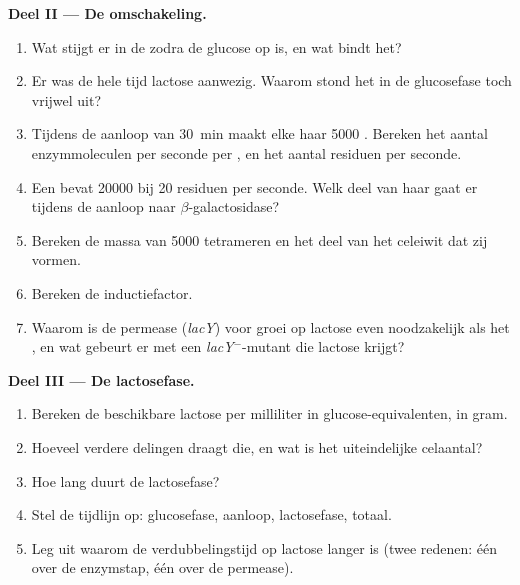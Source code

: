 \begin{problem}
\medskip
\noindent\textbf{Deel II --- De omschakeling.}
\begin{enumerate}[resume]
  \item Wat stijgt er in de  zodra de glucose op is, en wat bindt
        het?
  \item Er was de hele tijd lactose aanwezig. Waarom stond het  in de
        glucosefase toch vrijwel uit?
  \item Tijdens de aanloop van \qty{30}{min} maakt elke  haar
        \num{5000} . Bereken het aantal enzymmoleculen per seconde
        per , en het aantal residuen per seconde.
  \item Een  bevat \num{20000}  bij \qty{20}{} residuen per
        seconde. Welk deel van haar  gaat er tijdens de aanloop
        naar $\beta$-galactosidase?
  \item Bereken de massa van \num{5000} tetrameren en het deel van het
        celeiwit dat zij vormen.
  \item Bereken de inductiefactor.
  \item Waarom is de permease (\emph{lacY}) voor groei op lactose even
        noodzakelijk als het , en wat gebeurt er met een
        \emph{lacY}$^-$-mutant die lactose krijgt?
\end{enumerate}

\medskip
\noindent\textbf{Deel III --- De lactosefase.}
\begin{enumerate}[resume]
  \item Bereken de beschikbare lactose per milliliter in
        glucose-equivalenten, in gram.
  \item Hoeveel verdere delingen draagt die, en wat is het uiteindelijke
        celaantal?
  \item Hoe lang duurt de lactosefase?
  \item Stel de tijdlijn op: glucosefase, aanloop, lactosefase, totaal.
  \item Leg uit waarom de verdubbelingstijd op lactose langer is (twee
        redenen: één over de enzymstap, één over de permease).
\end{enumerate}


\end{problem}
